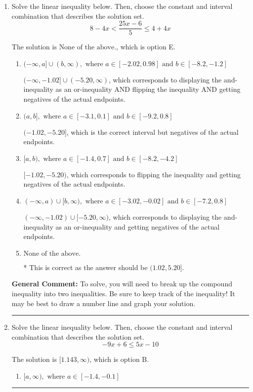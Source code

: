 \documentclass{extbook}[14pt]
\newcommand{\litem}[1]{\item #1

\rule{\textwidth}{0.4pt}}
\begin{document}
\begin{enumerate}\litem{
Solve the linear inequality below. Then, choose the constant and interval combination that describes the solution set.
\[ 8 - 4 x < \frac{25 x - 6}{5} \leq 4 + 4 x \]

The solution is \( \text{None of the above.} \), which is option E.\begin{enumerate}[label=\Alph*.]
\item \( (-\infty, a] \cup (b, \infty), \text{ where } a \in [-2.02, 0.98] \text{ and } b \in [-8.2, -1.2] \)

$(-\infty, -1.02] \cup (-5.20, \infty)$, which corresponds to displaying the and-inequality as an or-inequality AND flipping the inequality AND getting negatives of the actual endpoints.
\item \( (a, b], \text{ where } a \in [-3.1, 0.1] \text{ and } b \in [-9.2, 0.8] \)

$(-1.02, -5.20]$, which is the correct interval but negatives of the actual endpoints.
\item \( [a, b), \text{ where } a \in [-1.4, 0.7] \text{ and } b \in [-8.2, -4.2] \)

$[-1.02, -5.20)$, which corresponds to flipping the inequality and getting negatives of the actual endpoints.
\item \( (-\infty, a) \cup [b, \infty), \text{ where } a \in [-3.02, -0.02] \text{ and } b \in [-7.2, 0.8] \)

$(-\infty, -1.02) \cup [-5.20, \infty)$, which corresponds to displaying the and-inequality as an or-inequality and getting negatives of the actual endpoints.
\item \( \text{None of the above.} \)

* This is correct as the answer should be $(1.02, 5.20]$.
\end{enumerate}

\textbf{General Comment:} To solve, you will need to break up the compound inequality into two inequalities. Be sure to keep track of the inequality! It may be best to draw a number line and graph your solution.
}
\litem{
Solve the linear inequality below. Then, choose the constant and interval combination that describes the solution set.
\[ -9x + 6 \leq 5x -10 \]

The solution is \( [1.143, \infty) \), which is option B.\begin{enumerate}[label=\Alph*.]
\item \( [a, \infty), \text{ where } a \in [-1.4, -0.1] \)


\end{enumerate}}
\end{enumerate}
\end{document}
